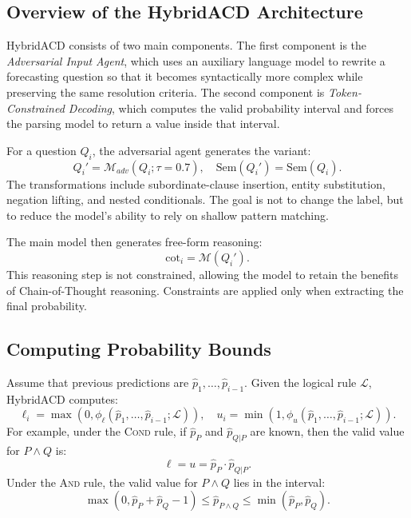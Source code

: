 \documentclass[pdflatex,sn-mathphys-num]{sn-jnl}
\begin{document}
\subsection{Overview of the HybridACD Architecture}

HybridACD consists of two main components. The first component is the \textit{Adversarial Input Agent}, which uses an auxiliary language model to rewrite a forecasting question so that it becomes syntactically more complex while preserving the same resolution criteria. The second component is \textit{Token-Constrained Decoding}, which computes the valid probability interval and forces the parsing model to return a value inside that interval.

For a question $Q_i$, the adversarial agent generates the variant:
\begin{equation}
  Q_i' = \mathcal{M}_{adv}(Q_i;\tau=0.7),
  \quad \text{Sem}(Q_i')=\text{Sem}(Q_i).
\end{equation}
The transformations include subordinate-clause insertion, entity substitution, negation lifting, and nested conditionals. The goal is not to change the label, but to reduce the model's ability to rely on shallow pattern matching.

The main model then generates free-form reasoning:
\begin{equation}
  \text{cot}_i=\mathcal{M}(Q_i').
\end{equation}
This reasoning step is not constrained, allowing the model to retain the benefits of Chain-of-Thought reasoning. Constraints are applied only when extracting the final probability.

\subsection{Computing Probability Bounds}

Assume that previous predictions are $\hat{p}_1,\ldots,\hat{p}_{i-1}$. Given the logical rule $\mathcal{L}$, HybridACD computes:
\begin{equation}
  \ell_i = \max(0,\phi_{\ell}(\hat{p}_1,\ldots,\hat{p}_{i-1};\mathcal{L})),
  \quad
  u_i = \min(1,\phi_{u}(\hat{p}_1,\ldots,\hat{p}_{i-1};\mathcal{L})).
  \label{eq:bounds}
\end{equation}
For example, under the \textsc{Cond} rule, if $\hat{p}_P$ and $\hat{p}_{Q|P}$ are known, then the valid value for $P\wedge Q$ is:
\begin{equation}
  \ell=u=\hat{p}_P \cdot \hat{p}_{Q|P}.
\end{equation}
Under the \textsc{And} rule, the valid value for $P\wedge Q$ lies in the interval:
\begin{equation}
  \max(0,\hat{p}_P+\hat{p}_Q-1)
  \leq \hat{p}_{P\wedge Q}
  \leq
  \min(\hat{p}_P,\hat{p}_Q).
\end{equation}
\end{document}
